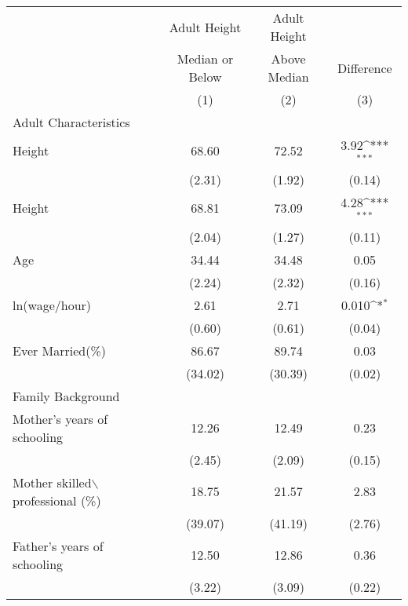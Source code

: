 \documentclass[12pt]{article}
\begin{document}
\clearpage
\def\sym#1{\ifmmode^{#1}\else\(^{#1}\)\fi}
\begin{table}[h!]
    \begin{tabular}{|l | c | c | c |} 
        \hline 
         & Adult Height  & 
           Adult Height  & 
            \\
         & Median or Below  & 
           Above Median & 
            Difference \\
         & (1) & 
           (2) & 
           (3) \\
        \hline
        Adult Characteristics & & &\\
        \hline
        \tabindent 1981 Height & 68.60  & 72.52  & 3.92\sym{***} \\
                            & (2.31) & (1.92) & (0.14)\\
        \hline
        \tabindent 1985 Height & 68.81  & 73.09  & 4.28\sym{***} \\
                           & (2.04) & (1.27) &  (0.11) \\
        \hline
        \tabindent Age     & 34.44  & 34.48  & 0.05 \\
                           & (2.24) & (2.32) &  (0.16)       \\
        \hline
        \tabindent ln(wage/hour)     & 2.61   & 2.71  & 0.010\sym{*} \\
                                     & (0.60) & (0.61) &  (0.04)       \\
        \hline
        \tabindent Ever Married(\%)  & 86.67  & 89.74 & 0.03 \\
                                     & (34.02) & (30.39) & (0.02) \\
        \hline
        Family Background & & & \\
        \hline
        \tabindent Mother's years of schooling & 12.26 & 12.49 & 0.23\\
                                               & (2.45) & (2.09) & (0.15) \\
        \hline
        \tabindent Mother skilled$\backslash$professional (\%) & 
                                                    18.75 &  21.57 & 2.83 \\
                                                 & (39.07) & (41.19) & (2.76) \\
        \hline
        \tabindent Father's years of schooling & 12.50 & 12.86 & 0.36 \\
                                               & (3.22) & (3.09) & (0.22) \\

\end{tabular}
\end{table}
\end{document}
